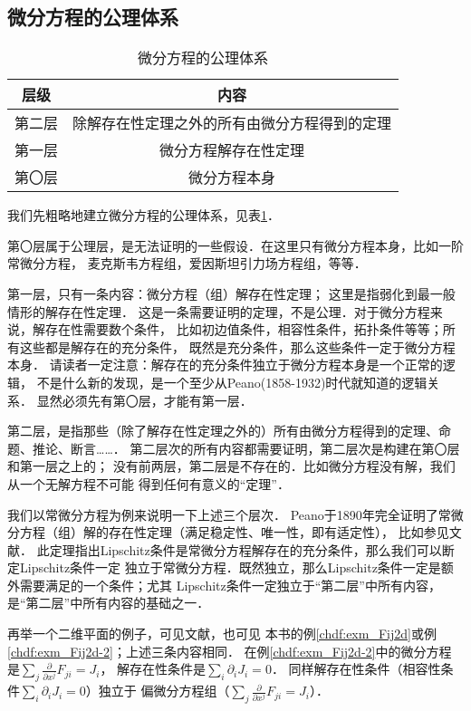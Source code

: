 \subsection{微分方程的公理体系}


\begin{table}[htb]
    \centering
    \caption{微分方程的公理体系} \label{chfd:tab-diff-axiom}
    \begin{tabular}{|*2{c|}}
        \hline
        层级 & 内容 \\ \hline
        第二层 & 除解存在性定理之外的所有由微分方程得到的定理  \\ \hline
        第一层 & 微分方程解存在性定理 \\ \hline
        第〇层 & 微分方程本身   \\ \hline
    \end{tabular}
\end{table}

我们先粗略地建立微分方程的公理体系，见表\ref{chfd:tab-diff-axiom}．

第〇层属于公理层，是无法证明的一些假设．在这里只有微分方程本身，比如一阶常微分方程，
麦克斯韦方程组，爱因斯坦引力场方程组，等等．

第一层，只有一条内容：微分方程（组）解存在性定理；
这里是指弱化到最一般情形的解存在性定理．
这是一条需要证明的定理，不是公理．对于微分方程来说，解存在性需要数个条件，
比如初边值条件，相容性条件，拓扑条件等等；所有这些都是解存在的充分条件，
既然是充分条件，那么这些条件一定于微分方程本身．
请读者一定注意：解存在的充分条件独立于微分方程本身是一个正常的逻辑，
不是什么新的发现，是一个至少从Peano(1858-1932)时代就知道的逻辑关系．
显然必须先有第〇层，才能有第一层．

第二层，是指那些（除了解存在性定理之外的）所有由微分方程得到的定理、命题、推论、断言……．
第二层次的所有内容都需要证明，第二层次是构建在第〇层和第一层之上的；
没有前两层，第二层是不存在的．比如微分方程没有解，我们从一个无解方程不可能
得到任何有意义的“定理”．

我们以常微分方程为例来说明一下上述三个层次．
Peano于1890年完全证明了常微分方程（组）解的存在性定理（满足稳定性、唯一性，即有适定性），
比如参见文献\parencite[\S 31]{arnold-2001-ode}．
此定理指出Lipschitz条件是常微分方程解存在的充分条件，那么我们可以断定Lipschitz条件一定
独立于常微分方程．既然独立，那么Lipschitz条件一定是额外需要满足的一个条件；尤其
Lipschitz条件一定独立于“第二层”中所有内容，是“第二层”中所有内容的基础之一．

再举一个二维平面的例子，可见文献\parencite[p.16]{courant_hilbert-v2}，也可见
本书的例\ref{chdf:exm_Fij2d}或例\ref{chdf:exm_Fij2d-2}；上述三条内容相同．
在例\ref{chdf:exm_Fij2d-2}中的微分方程是$\sum_{j}\frac{\partial}{\partial x^j} F_{ji} = J_{i} $，
解存在性条件是$\sum_{i} \partial_i J_i = 0$．
同样解存在性条件（相容性条件$\sum_{i} \partial_i J_i = 0$）独立于
偏微分方程组（$\sum_{j}\frac{\partial}{\partial x^j} F_{ji} = J_{i} $）．



